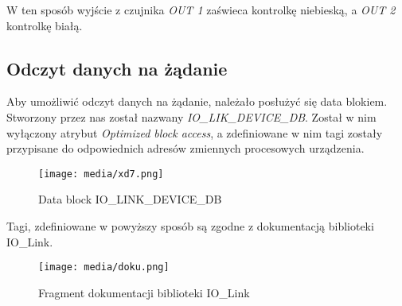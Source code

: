 \documentclass{article}
\begin{document}
W ten sposób wyjście z czujnika \textit{OUT 1} zaświeca kontrolkę niebieską, a \textit{OUT 2} kontrolkę białą.

\subsection{Odczyt danych na żądanie}

Aby umożliwić odczyt danych na żądanie, należało posłużyć się data blokiem. Stworzony przez nas został nazwany \textit{IO\_LIK\_DEVICE\_DB}. Został w nim wyłączony atrybut \textit{Optimized block access}, a zdefiniowane w nim tagi zostały przypisane do odpowiednich adresów zmiennych procesowych urządzenia.

\begin{figure}[H]
    \centering
    \texttt{[image: media/xd7.png]}
    \caption{Data block IO\_LINK\_DEVICE\_DB}
    \label{fig:db}
\end{figure}

Tagi, zdefiniowane w powyższy sposób są zgodne z dokumentacją biblioteki IO\_Link.
\begin{figure}[H]
    \centering
    \texttt{[image: media/doku.png]}
    \caption{Fragment dokumentacji biblioteki IO\_Link}
    \label{fig:tagi}
\end{figure}
\end{document}
